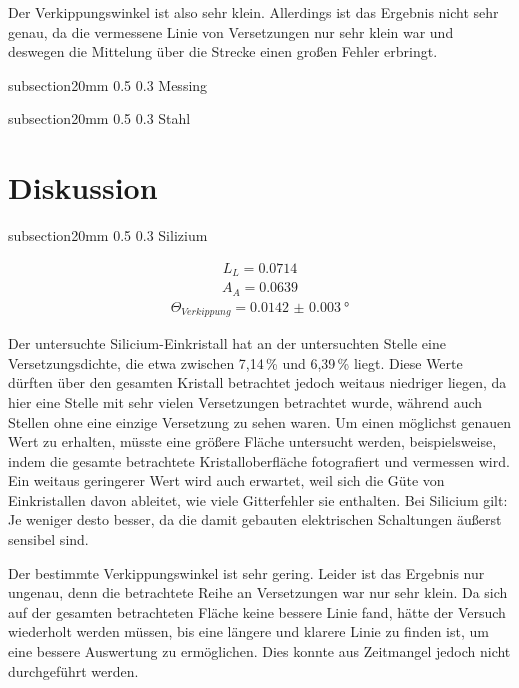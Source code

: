 \documentclass[german, %
parskip=full, %
bibliography=totoc, %
]{scrartcl}
\makeatletter
\renewcommand\subsection{\@startsection 
   {subsection}{2}{0mm}%
   {0.5\baselineskip}%
   {0.3\baselineskip}%
   {\bfseries\sffamily\large}%
   }
\makeatother
\begin{document}
Der Verkippungswinkel ist also sehr klein. Allerdings ist das Ergebnis nicht sehr genau, da die vermessene Linie von Versetzungen nur sehr klein war und deswegen die Mittelung über die Strecke einen großen Fehler erbringt. 

\subsection{Messing}



\subsection{Stahl}



\section{Diskussion}

\subsection{Silizium}

\begin{align*}
L_L = 0.0714
\end{align*}
\begin{align*}
A_A = 0.0639
\end{align*}
\begin{align*}
\Theta_{Verkippung} = \SI[separate-uncertainty = true]{0.0142(30)}{\degree}
\end{align*}

Der untersuchte Silicium-Einkristall hat an der untersuchten Stelle eine Versetzungsdichte, die etwa zwischen 7,14\,\% und 6,39\,\% liegt. Diese Werte dürften über den gesamten Kristall betrachtet jedoch weitaus niedriger liegen, da hier eine Stelle mit sehr vielen Versetzungen betrachtet wurde, während auch Stellen ohne eine einzige Versetzung zu sehen waren. Um einen möglichst genauen Wert zu erhalten, müsste eine größere Fläche untersucht werden, beispielsweise, indem die gesamte betrachtete Kristalloberfläche fotografiert und vermessen wird. Ein weitaus geringerer Wert wird auch erwartet, weil sich die Güte von Einkristallen davon ableitet, wie viele Gitterfehler sie enthalten. Bei Silicium gilt: Je weniger desto besser, da die damit gebauten elektrischen Schaltungen äußerst sensibel sind.

Der bestimmte Verkippungswinkel ist sehr gering. Leider ist das Ergebnis nur ungenau, denn die betrachtete Reihe an Versetzungen war nur sehr klein. Da sich auf der gesamten betrachteten Fläche keine bessere Linie fand, hätte der Versuch wiederholt werden müssen, bis eine längere und klarere Linie zu finden ist, um eine bessere Auswertung zu ermöglichen. Dies konnte aus Zeitmangel jedoch nicht durchgeführt werden.
\end{document}
